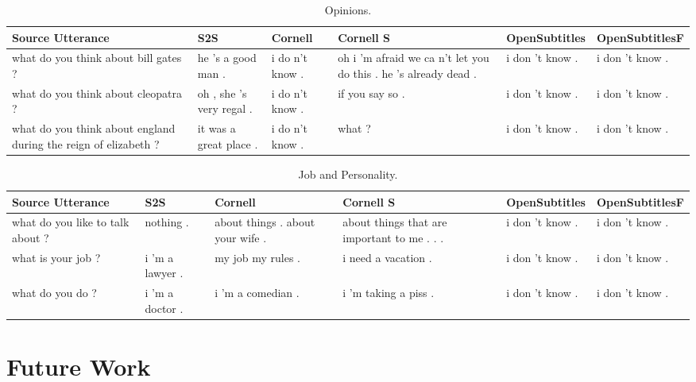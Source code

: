 \documentclass[12pt]{article}
\begin{document}
\begin{table}[H]
	\centering
	\begin{tabular}{|L{2.3cm}|L{2.3cm}|L{2.3cm}|L{2.3cm}|L{2.3cm}|L{2.3cm}|}
		\hline
		\textbf{Source Utterance} & \textbf{S2S} & \textbf{Cornell} & \textbf{Cornell S} & \textbf{OpenSubtitles} & \textbf{OpenSubtitlesF}\\ \hline
		what do you think about bill gates ? & he ’s a good man . & i do n't know . & oh i 'm afraid we ca n't let you do this . he 's already dead . & i don 't know . & i don 't know .
		\\ \hline
		what do you think about cleopatra ? & oh , she ’s very regal . & i do n't know . & if you say so . & i don 't know . & i don 't know .
		\\ \hline
		what do you think about england during the reign of elizabeth ? & it was a great place . & i do n't know . & what ? & i don 't know . & i don 't know .
		\\ \hline
		
	\end{tabular}
	\caption{Opinions.}	
	\label{table:opinionsNCM}
\end{table}
\begin{table}[H]
	\centering
	\begin{tabular}{|L{2.3cm}|L{2.3cm}|L{2.3cm}|L{2.3cm}|L{2.3cm}|L{2.3cm}|}
		\hline
		\textbf{Source Utterance} & \textbf{S2S} & \textbf{Cornell} & \textbf{Cornell S} & \textbf{OpenSubtitles} & \textbf{OpenSubtitlesF}\\ \hline
		what do you like to talk about ? & nothing . & about things . about your wife .  & about things that are important to me . . . & i don 't know . & i don 't know .
		\\ \hline
		what is your job ? & i 'm a lawyer . & my job my rules .  & i need a vacation . & i don 't know . & i don 't know .
		\\ \hline
		what do you do ? & i 'm a doctor . & i 'm a comedian .   & i 'm taking a piss . & i don 't know . & i don 't know .
		\\ \hline
		
	\end{tabular}
	\caption{Job and Personality.}	
	\label{table:personalityNCM}
\end{table}

\newpage\section{Future Work} \label{sec:future}
\end{document}
